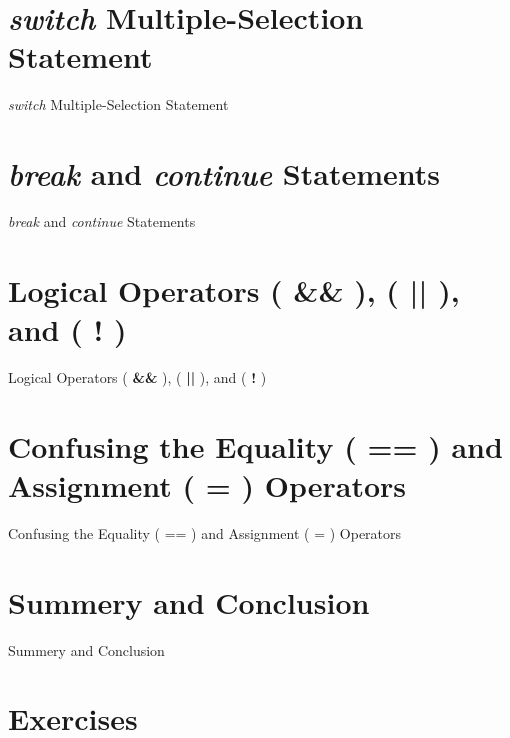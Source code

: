 \documentclass[10pt]{beamer}
\begin{document}
\section{\textbf{\textit{\color{lblue}switch}} Multiple-Selection Statement}
\begin{frame}{\textit{\color{blue}switch} Multiple-Selection Statement}
	\lipsum[2]
\end{frame}


\section{\textbf{\textit{\color{lblue}break}} and \textbf{\textit{\color{lblue}continue}} Statements}
\begin{frame}{\textit{\color{blue}break} and \textit{\color{blue}continue} Statements}
	\lipsum[2]
\end{frame}


\section{Logical Operators ( {\color{lblue}\textbf{\&\&}} ), ( {\color{lblue}\textbf{||}} ), and ( {\color{lblue}\textbf{!}} )}

\begin{frame}{Logical Operators ( {\color{blue}\textbf{\&\&}} ), ( {\color{blue}\textbf{||}} ), and ( {\color{blue}\textbf{!}} )}
	\lipsum[2]
\end{frame}


\section{Confusing the Equality ( {\color{lblue}\textbf{==}} ) and Assignment ( {\color{lblue}\textbf{=}} ) Operators}
\begin{frame}{\footnotesize Confusing the Equality ( {\color{blue} == }) and Assignment ( {\color{blue} = }) Operators}
	\lipsum[2]
\end{frame}


\section{Summery and Conclusion}

\begin{frame}{Summery and Conclusion}
	\lipsum[2]
\end{frame}


\section{Exercises}
\end{document}

